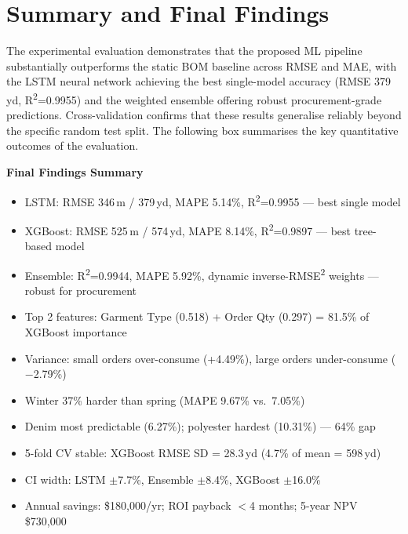 \secdiv
\section{Summary and Final Findings}

The experimental evaluation demonstrates that the proposed ML pipeline substantially outperforms the static BOM baseline across RMSE and MAE, with the LSTM neural network achieving the best single-model accuracy (RMSE 379\,yd, R\textsuperscript{2}=0.9955) and the weighted ensemble offering robust procurement-grade predictions. Cross-validation confirms that these results generalise reliably beyond the specific random test split. The following box summarises the key quantitative outcomes of the evaluation.

\begin{mdframed}[style=findingbox]
\textbf{Final Findings Summary}
\begin{itemize}[leftmargin=*,noitemsep]
  \item LSTM: RMSE 346\,m / 379\,yd, MAPE 5.14\%, R\textsuperscript{2}=0.9955 --- best single model
  \item XGBoost: RMSE 525\,m / 574\,yd, MAPE 8.14\%, R\textsuperscript{2}=0.9897 --- best tree-based model
  \item Ensemble: R\textsuperscript{2}=0.9944, MAPE 5.92\%, dynamic inverse-RMSE\textsuperscript{2} weights --- robust for procurement
  \item Top 2 features: Garment Type (0.518) + Order Qty (0.297) = 81.5\% of XGBoost importance
  \item Variance: small orders over-consume (+4.49\%), large orders under-consume ($-$2.79\%)
  \item Winter 37\% harder than spring (MAPE 9.67\% vs.\ 7.05\%)
  \item Denim most predictable (6.27\%); polyester hardest (10.31\%) --- 64\% gap
  \item 5-fold CV stable: XGBoost RMSE SD = 28.3\,yd (4.7\% of mean = 598\,yd)
  \item CI width: LSTM $\pm$7.7\%, Ensemble $\pm$8.4\%, XGBoost $\pm$16.0\%
  \item Annual savings: \$180{,}000/yr; ROI payback $<$4 months; 5-year NPV \$730{,}000
\end{itemize}
\end{mdframed}

